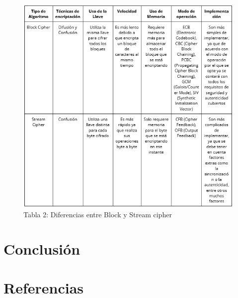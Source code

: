 \documentclass[a4paper,10pt]{article}
\begin{document}
	\begin{figure}[h]
		\centering
		\includegraphics[width=1.0\textwidth]{tablaBlockStreamCipher.PNG}
		\caption{Tabla 2: Diferencias entre Block y Stream cipher}
		\label{Diferencias_Block_Stream_Cipher}
	\end{figure}
	\section{Conclusión}
	
	\section{Referencias}
	\nocite{*}
	\printbibliography[heading=none]
\end{document}
